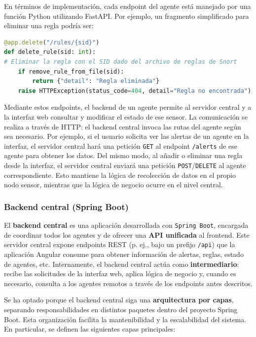 \documentclass[11pt,a4paper,twoside]{report}
\begin{document}
En términos de implementación, cada endpoint del agente está manejado por una función Python utilizando FastAPI. Por ejemplo, un fragmento simplificado para eliminar una regla podría ser:

\begin{lstlisting}[language=Python, caption={Fragmento del código que maneja cada endpoint}, label={lst:ejemplo-endpoint}]
@app.delete("/rules/{sid}")
def delete_rule(sid: int):
# Eliminar la regla con el SID dado del archivo de reglas de Snort
	if remove_rule_from_file(sid):
		return {"detail": "Regla eliminada"}
	raise HTTPException(status_code=404, detail="Regla no encontrada")
\end{lstlisting}

Mediante estos endpoints, el backend de un agente permite al servidor central y a la interfaz web consultar y modificar el estado de ese sensor. La comunicación se realiza a través de HTTP: el backend central invoca las rutas del agente según sea necesario. Por ejemplo, si el usuario solicita ver las alertas de un agente en la interfaz, el servidor central hará una petición \texttt{GET} al endpoint \texttt{/alerts} de ese agente para obtener los datos. Del mismo modo, al añadir o eliminar una regla desde la interfaz, el servidor central enviará una petición \texttt{POST}/\texttt{DELETE} al agente correspondiente. Esto mantiene la lógica de recolección de datos en el propio nodo sensor, mientras que la lógica de negocio ocurre en el nivel central.

\subsubsection{Backend central (Spring Boot)}

El \textbf{backend central} es una aplicación desarrollada con \texttt{Spring Boot}, encargada de coordinar todos los agentes y de ofrecer una \textbf{API unificada} al frontend. Este servidor central expone endpoints REST (p. ej., bajo un prefijo \texttt{/api}) que la aplicación Angular consume para obtener información de alertas, reglas, estado de agentes, etc. Internamente, el backend central actúa como \textbf{intermediario}: recibe las solicitudes de la interfaz web, aplica lógica de negocio y, cuando es necesario, consulta a los agentes remotos a través de los endpoints antes descritos.\newline

Se ha optado porque el backend central siga una \textbf{arquitectura por capas}, separando responsabilidades en distintos paquetes dentro del proyecto Spring Boot. Esta organización facilita la mantenibilidad y la escalabilidad del sistema. En particular, se definen las siguientes capas principales:
\end{document}
